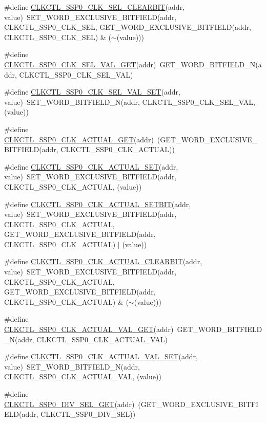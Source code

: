 \begin{DoxyCompactItemize}
\#define \hyperlink{a00544_ac9b9a8d7482ec6daa20f3332134f2c4a}{CLKCTL\_\-SSP0\_\-CLK\_\-SEL\_\-CLEARBIT}(addr, value)~SET\_\-WORD\_\-EXCLUSIVE\_\-BITFIELD(addr, CLKCTL\_\-SSP0\_\-CLK\_\-SEL, GET\_\-WORD\_\-EXCLUSIVE\_\-BITFIELD(addr, CLKCTL\_\-SSP0\_\-CLK\_\-SEL) \& ($\sim$(value)))
\item 
\#define \hyperlink{a00544_ad24a183028c6a764dbc48438ea863978}{CLKCTL\_\-SSP0\_\-CLK\_\-SEL\_\-VAL\_\-GET}(addr)~GET\_\-WORD\_\-BITFIELD\_\-N(addr, CLKCTL\_\-SSP0\_\-CLK\_\-SEL\_\-VAL)
\item 
\#define \hyperlink{a00544_aaff46098bcb52166d066ab256a73af94}{CLKCTL\_\-SSP0\_\-CLK\_\-SEL\_\-VAL\_\-SET}(addr, value)~SET\_\-WORD\_\-BITFIELD\_\-N(addr, CLKCTL\_\-SSP0\_\-CLK\_\-SEL\_\-VAL, (value))
\item 
\#define \hyperlink{a00544_aa82ad6ac4141f9b679bf4b37c4549a1c}{CLKCTL\_\-SSP0\_\-CLK\_\-ACTUAL\_\-GET}(addr)~(GET\_\-WORD\_\-EXCLUSIVE\_\-BITFIELD(addr, CLKCTL\_\-SSP0\_\-CLK\_\-ACTUAL))
\item 
\#define \hyperlink{a00544_a050a4a5ffb64ec8e1eec172186df164a}{CLKCTL\_\-SSP0\_\-CLK\_\-ACTUAL\_\-SET}(addr, value)~SET\_\-WORD\_\-EXCLUSIVE\_\-BITFIELD(addr, CLKCTL\_\-SSP0\_\-CLK\_\-ACTUAL, (value))
\item 
\#define \hyperlink{a00544_a83699cafba43d7267194282f378b4a6f}{CLKCTL\_\-SSP0\_\-CLK\_\-ACTUAL\_\-SETBIT}(addr, value)~SET\_\-WORD\_\-EXCLUSIVE\_\-BITFIELD(addr, CLKCTL\_\-SSP0\_\-CLK\_\-ACTUAL, GET\_\-WORD\_\-EXCLUSIVE\_\-BITFIELD(addr, CLKCTL\_\-SSP0\_\-CLK\_\-ACTUAL) $|$ (value))
\item 
\#define \hyperlink{a00544_a234c60637cc45ee2887f9c902d633ccc}{CLKCTL\_\-SSP0\_\-CLK\_\-ACTUAL\_\-CLEARBIT}(addr, value)~SET\_\-WORD\_\-EXCLUSIVE\_\-BITFIELD(addr, CLKCTL\_\-SSP0\_\-CLK\_\-ACTUAL, GET\_\-WORD\_\-EXCLUSIVE\_\-BITFIELD(addr, CLKCTL\_\-SSP0\_\-CLK\_\-ACTUAL) \& ($\sim$(value)))
\item 
\#define \hyperlink{a00544_af3fcd69c23ad760ff9d97ccd96a26154}{CLKCTL\_\-SSP0\_\-CLK\_\-ACTUAL\_\-VAL\_\-GET}(addr)~GET\_\-WORD\_\-BITFIELD\_\-N(addr, CLKCTL\_\-SSP0\_\-CLK\_\-ACTUAL\_\-VAL)
\item 
\#define \hyperlink{a00544_af0ec5aa27464f3adb51a57fe5da06051}{CLKCTL\_\-SSP0\_\-CLK\_\-ACTUAL\_\-VAL\_\-SET}(addr, value)~SET\_\-WORD\_\-BITFIELD\_\-N(addr, CLKCTL\_\-SSP0\_\-CLK\_\-ACTUAL\_\-VAL, (value))
\item 
\#define \hyperlink{a00544_a344ba4d9f981b753aaeebb5e9733da6a}{CLKCTL\_\-SSP0\_\-DIV\_\-SEL\_\-GET}(addr)~(GET\_\-WORD\_\-EXCLUSIVE\_\-BITFIELD(addr, CLKCTL\_\-SSP0\_\-DIV\_\-SEL))

\end{DoxyCompactItemize}

